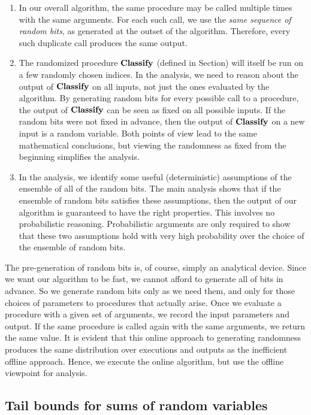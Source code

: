 \documentclass{acmsmall}
\newcommand{\classify}{{\rm {\bf Classify}}}
\begin{document}
\begin{enumerate}
\item In our overall algorithm, the same procedure may be called multiple times with the same arguments. For each
such call, we use the \emph{same sequence of random bits}, as generated at the outset of the algorithm.
Therefore, every such duplicate
call produces the same output.
\item The randomized procedure $\classify$ (defined in Section) will itself be run on a few randomly chosen indices.
In the analysis, we need to reason about the output of $\classify$
on all inputs, not just the ones evaluated by the algorithm. By generating random bits for every possible call
to a procedure, the output of $\classify$ can be seen as fixed on all possible inputs.
If the random bits were not fixed in advance, then the output of $\classify$ on a new input 
is a random variable.  Both points of view lead to the same mathematical conclusions,
but viewing the randomness as fixed from the  beginning simplifies the analysis.
\item In the analysis, we identify some useful (deterministic) assumptions of the ensemble of all of the random bits.   
The main analysis
shows that if the ensemble of random bits satisfies these assumptions, 
then the output of our algorithm is guaranteed to have the right properties. This involves no probabilistic reasoning.  
Probabilistic arguments are only required to show that these two assumptions 
hold with very high probability over the choice of the ensemble of random bits.  
\end{enumerate}

The pre-generation of random bits is, of course, simply an analytical
device.  Since we want our algorithm to be fast, we cannot afford
to generate all  of bits in advance. So 
we generate random bits only as we need them, and only for those choices of parameters to procedures that actually arise.  Once we evaluate
a procedure with a given set of arguments, we record the input parameters and output. If the same procedure is called again
with the same arguments, we return the same value.    It is evident that this online approach to generating randomness produces the same
distribution over executions and outputs as the inefficient offline approach. Hence, we execute the online algorithm,
but use the offline viewpoint for analysis. 


\subsection{Tail bounds for sums of random variables}
\label{subsec:tail}
\end{document}
